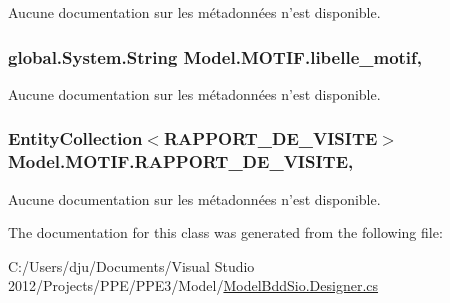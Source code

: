 Aucune documentation sur les métadonnées n'est disponible. 

\hypertarget{class_model_1_1_m_o_t_i_f_a72046bb40be3fd2da573e935fb49a81b}{
\subsubsection[{libelle\-\_\-motif}]{\setlength{\rightskip}{0pt plus 5cm}global.\-System.\-String Model.\-M\-O\-T\-I\-F.\-libelle\-\_\-motif\hspace{0.3cm}{\ttfamily [get]}, {\ttfamily [set]}}}\label{class_model_1_1_m_o_t_i_f_a72046bb40be3fd2da573e935fb49a81b}


Aucune documentation sur les métadonnées n'est disponible. 

\hypertarget{class_model_1_1_m_o_t_i_f_a274a1b2205178e4d10d4facee7b4653b}{
\subsubsection[{R\-A\-P\-P\-O\-R\-T\-\_\-\-D\-E\-\_\-\-V\-I\-S\-I\-T\-E}]{\setlength{\rightskip}{0pt plus 5cm}Entity\-Collection$<${\bf R\-A\-P\-P\-O\-R\-T\-\_\-\-D\-E\-\_\-\-V\-I\-S\-I\-T\-E}$>$ Model.\-M\-O\-T\-I\-F.\-R\-A\-P\-P\-O\-R\-T\-\_\-\-D\-E\-\_\-\-V\-I\-S\-I\-T\-E\hspace{0.3cm}{\ttfamily [get]}, {\ttfamily [set]}}}\label{class_model_1_1_m_o_t_i_f_a274a1b2205178e4d10d4facee7b4653b}


Aucune documentation sur les métadonnées n'est disponible. 



The documentation for this class was generated from the following file\-:\begin{DoxyCompactItemize}
\item 
C\-:/\-Users/dju/\-Documents/\-Visual Studio 2012/\-Projects/\-P\-P\-E/\-P\-P\-E3/\-Model/\hyperlink{_model_bdd_sio_8_designer_8cs}{Model\-Bdd\-Sio.\-Designer.\-cs}\end{DoxyCompactItemize}
